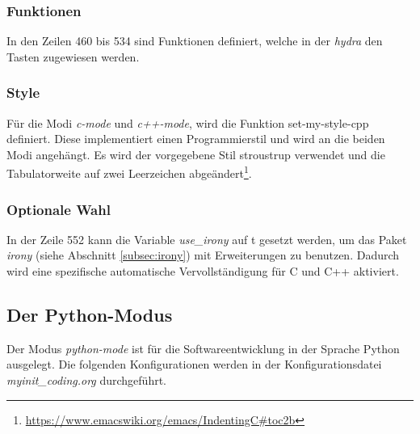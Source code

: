 \subsubsection{Funktionen}
In den Zeilen 460 bis 534 sind Funktionen definiert, welche in der
\textit{hydra} den Tasten zugewiesen werden.\\

\subsubsection{Style}
Für die Modi \textit{c-mode} und \textit{c++-mode}, wird die Funktion
{\glqq}set-my-style-cpp{\grqq} definiert. Diese implementiert einen
Programmierstil und wird an die beiden Modi angehängt. Es wird der
vorgegebene Stil {\glqq}stroustrup{\grqq} verwendet und die
Tabulatorweite auf zwei Leerzeichen
abgeändert\footnote{\url{https://www.emacswiki.org/emacs/IndentingC\#toc2b}}.\\

\subsubsection{Optionale Wahl}
In der Zeile 552 kann die Variable \textit{use\_irony} auf
{\glqq}t{\grqq} gesetzt werden, um das Paket \textit{irony} (siehe
Abschnitt \ref{subsec:irony}) mit Erweiterungen zu benutzen. Dadurch
wird eine spezifische automatische Vervollständigung für C und C++
aktiviert.\\

\subsection{Der Python-Modus}
\label{subsec:pythonmoduskonf}
Der Modus \textit{python-mode} ist für die Softwareentwicklung in der
Sprache Python ausgelegt. Die folgenden Konfigurationen werden in der
Konfigurationsdatei \textit{myinit\_coding.org} durchgeführt.\\

